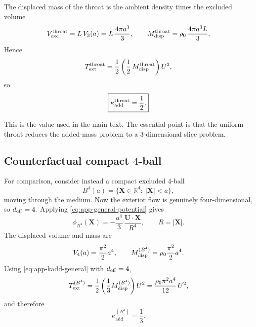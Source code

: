 \documentclass[11pt]{article}
\newcommand{\kadd}{\kappa_{\mathrm{add}}}
\begin{document}
The displaced mass of the throat is the ambient density times the excluded volume
\begin{equation}
V_{\rm exc}^{\rm throat}=L\,V_3(a)=L\,\frac{4\pi a^3}{3},
\qquad
M_{\rm disp}^{\rm throat}
=
\rho_0\,\frac{4\pi a^3L}{3}.
\label{eq:app-throat-disp}
\end{equation}
Hence
\begin{equation}
T_{\rm ext}^{\rm throat}
=
\frac12
\left(
\frac12\,M_{\rm disp}^{\rm throat}
\right)U^2,
\label{eq:app-throat-added-mass}
\end{equation}
so
\begin{equation}
\boxed{
\kadd^{\rm throat}=\frac12.
}
\label{eq:app-kadd-throat}
\end{equation}

This is the value used in the main text. The essential point is that the uniform throat
reduces the added-mass problem to a \(3\)-dimensional slice problem.

\subsection{Counterfactual compact \texorpdfstring{\(4\)}{4}-ball}
\label{app:added-mass-bubble}

For comparison, consider instead a compact excluded \(4\)-ball
\begin{equation}
B^4(a)=\{\mathbf X\in\mathbb R^4:\ |\mathbf X|<a\},
\label{eq:app-b4-geometry}
\end{equation}
moving through the medium. Now the exterior flow is genuinely four-dimensional, so
\(d_{\rm eff}=4\). Applying \eqref{eq:app-general-potential} gives
\begin{equation}
\phi_{B^4}(\mathbf X)
=
-\frac{a^4}{3}\,
\frac{\mathbf U\!\cdot\!\mathbf X}{R^4},
\qquad
R=|\mathbf X|.
\label{eq:app-b4-potential}
\end{equation}
The displaced volume and mass are
\begin{equation}
V_4(a)=\frac{\pi^2}{2}a^4,
\qquad
M_{\rm disp}^{(B^4)}=\rho_0\frac{\pi^2}{2}a^4.
\label{eq:app-b4-disp}
\end{equation}
Using \eqref{eq:app-kadd-general} with \(d_{\rm eff}=4\),
\begin{equation}
T_{\rm ext}^{(B^4)}
=
\frac12
\left(
\frac13 M_{\rm disp}^{(B^4)}
\right)U^2
=
\frac{\rho_0\pi^2 a^4}{12}\,U^2,
\label{eq:app-b4-energy}
\end{equation}
and therefore
\begin{equation}
\boxed{
\kadd^{(B^4)}=\frac13.
}
\label{eq:app-kadd-b4}
\end{equation}
\end{document}
